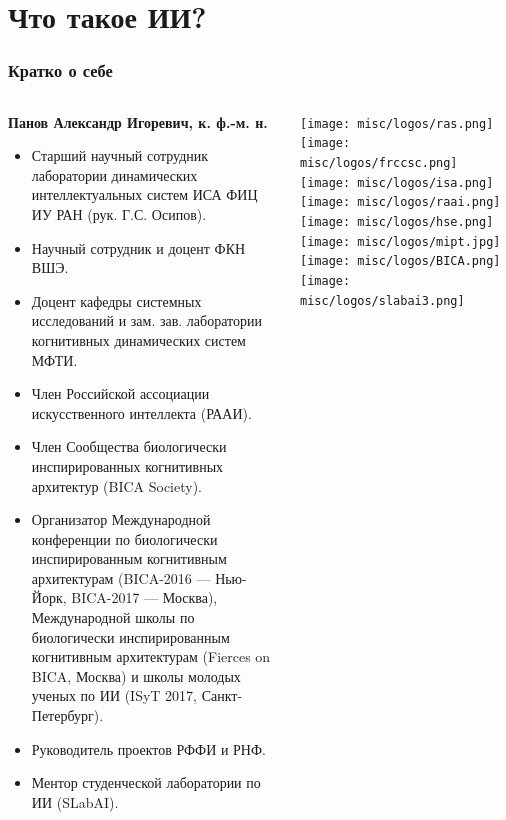 \documentclass[default]{beamer}
\begin{document}
	\section{Что такое ИИ?}
	\begin{frame}
		\frametitle{Кратко о себе}
		\scriptsize
		\begin{columns}
			\begin{column}{0.85\textwidth}
				\textbf{Панов Александр Игоревич, к. ф.-м. н.}
				\begin{itemize}
					\item Старший научный сотрудник лаборатории динамических интеллектуальных систем ИСА ФИЦ ИУ РАН (рук. Г.С. Осипов).
					\item Научный сотрудник и доцент ФКН ВШЭ.
					\item Доцент кафедры системных исследований и зам. зав. лаборатории когнитивных динамических систем МФТИ.
					\item Член Российской ассоциации искусственного интеллекта (РААИ).
					\item Член Сообщества биологически инспирированных когнитивных архитектур (BICA Society).
					\item Организатор Международной конференции по биологически инспирированным когнитивным архитектурам (BICA-2016 --- Нью-Йорк, BICA-2017 --- Москва), Международной школы по биологически инспирированным когнитивным архитектурам (Fierces on BICA, Москва) и школы молодых ученых по ИИ (ISyT 2017, Санкт-Петербург).
					\item Руководитель проектов РФФИ и РНФ.
					\item Ментор студенческой лаборатории по ИИ (SLabAI).
				\end{itemize}
			\end{column}
			
			\begin{column}{0.15\textwidth}
				\centering
				\texttt{[image: misc/logos/ras.png]}
				\vspace{7pt}
				\texttt{[image: misc/logos/frccsc.png]}
				\vspace{7pt}
				\texttt{[image: misc/logos/isa.png]}
				\vspace{7pt}
				\texttt{[image: misc/logos/raai.png]}
				\vspace{7pt}
				\texttt{[image: misc/logos/hse.png]}
				\vspace{7pt}
				\texttt{[image: misc/logos/mipt.jpg]}
				\vspace{5pt}
				\texttt{[image: misc/logos/BICA.png]}
				\vspace{5pt}
				\texttt{[image: misc/logos/slabai3.png]}
			\end{column}
			
		\end{columns}
	\end{frame}	
\end{document}
